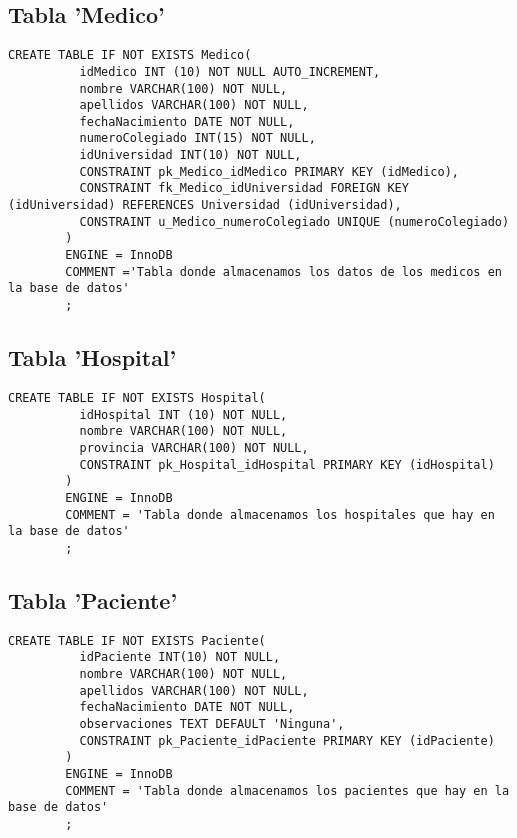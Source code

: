 \documentclass{article}
\begin{document}
  \newpage
    \subsection{Tabla 'Medico'}
      \begin{lstlisting}[style=C]
        CREATE TABLE IF NOT EXISTS Medico(
          idMedico INT (10) NOT NULL AUTO_INCREMENT,
          nombre VARCHAR(100) NOT NULL,
          apellidos VARCHAR(100) NOT NULL,
          fechaNacimiento DATE NOT NULL,
          numeroColegiado INT(15) NOT NULL,
          idUniversidad INT(10) NOT NULL,
          CONSTRAINT pk_Medico_idMedico PRIMARY KEY (idMedico),
          CONSTRAINT fk_Medico_idUniversidad FOREIGN KEY (idUniversidad) REFERENCES Universidad (idUniversidad),
          CONSTRAINT u_Medico_numeroColegiado UNIQUE (numeroColegiado)
        )
        ENGINE = InnoDB
        COMMENT ='Tabla donde almacenamos los datos de los medicos en la base de datos'
        ;
      \end{lstlisting}

    \subsection{Tabla 'Hospital'}
      \begin{lstlisting}[style=C]
        CREATE TABLE IF NOT EXISTS Hospital(
          idHospital INT (10) NOT NULL,
          nombre VARCHAR(100) NOT NULL,
          provincia VARCHAR(100) NOT NULL,
          CONSTRAINT pk_Hospital_idHospital PRIMARY KEY (idHospital)
        )
        ENGINE = InnoDB
        COMMENT = 'Tabla donde almacenamos los hospitales que hay en la base de datos'
        ;
      \end{lstlisting}

  \newpage
    \subsection{Tabla 'Paciente'}
      \begin{lstlisting}[style=C]
        CREATE TABLE IF NOT EXISTS Paciente(
          idPaciente INT(10) NOT NULL,
          nombre VARCHAR(100) NOT NULL,
          apellidos VARCHAR(100) NOT NULL,
          fechaNacimiento DATE NOT NULL,
          observaciones TEXT DEFAULT 'Ninguna',
          CONSTRAINT pk_Paciente_idPaciente PRIMARY KEY (idPaciente)
        )
        ENGINE = InnoDB
        COMMENT = 'Tabla donde almacenamos los pacientes que hay en la base de datos'
        ;
      \end{lstlisting}
\end{document}
